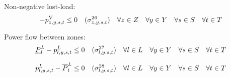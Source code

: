 \documentclass{article}
\newcommand{\sScenarioSets}{\quad \forall \iYear \in \sYears \quad \forall \iScenario \in \sScenarios \quad \forall \iInterval \in \sIntervals}
\begin{document}
%
%
%

Non-negative lost-load:
\begin{equation}
	- \vLostLoadPower \leq 0 \quad (\dNonNegativeLostLoad) \quad \forall \iZone \in \sZones \sScenarioSets
\end{equation}

Power flow between zones:
\begin{equation}
	\cPowerFlowMin - \vPowerFlow \leq 0 \quad (\dMinPowerFlow) \quad \forall \iLink \in \sLinks \sScenarioSets
\end{equation}

\begin{equation}
	\vPowerFlow - \cPowerFlowMax \leq 0 \quad (\dMaxPowerFlow) \quad \forall \iLink \in \sLinks \sScenarioSets
\end{equation}
\end{document}
